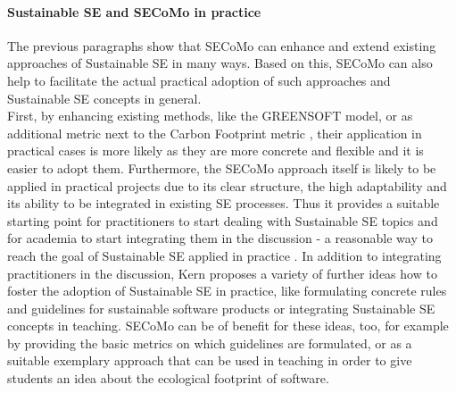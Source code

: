 \documentclass[oribibl]{llncs}
\begin{document}
\paragraph{Sustainable SE and SECoMo in practice}
The previous paragraphs show that SECoMo can enhance and extend existing approaches of Sustainable SE in many ways. Based on this, SECoMo can also help to facilitate the actual practical adoption of such approaches and Sustainable SE concepts in general.\\
First, by enhancing existing methods, like the GREENSOFT model, or as additional metric next to the Carbon Footprint metric \cite{kern_impacts_2015}, their application in practical cases is more likely as they are more concrete and flexible and it is easier to adopt them.
Furthermore, the SECoMo approach itself is likely to be applied in practical projects due to its clear structure, the high adaptability and its ability to be integrated in existing SE processes. %
Thus it provides a suitable starting point for practitioners to start dealing with Sustainable SE topics and for academia to start integrating them in the discussion - a reasonable way to reach the goal of Sustainable SE applied in practice \cite{kern_how_2016}.
In addition to integrating practitioners in the discussion, Kern \cite{kern_how_2016} proposes a variety of further ideas how to foster the adoption of Sustainable SE in practice, like formulating concrete rules and guidelines for sustainable software products or integrating Sustainable SE concepts in teaching. SECoMo can be of benefit for these ideas, too, for example by providing the basic metrics on which guidelines are formulated, or as a suitable exemplary approach that can be used in teaching in order to give students an idea about the ecological footprint of software.\\ %
\end{document}
